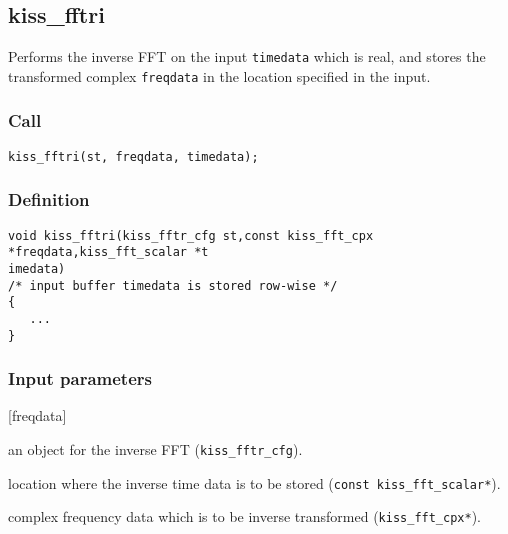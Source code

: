 \subsection{{kiss\_fftri}}
Performs the inverse FFT on the input \texttt{timedata} which is real, and stores the transformed complex \texttt{freqdata} in the location specified in the input.

\subsubsection*{Call}
\begin{verbatim}kiss_fftri(st, freqdata, timedata);\end{verbatim}

\subsubsection*{Definition}
\begin{verbatim}
void kiss_fftri(kiss_fftr_cfg st,const kiss_fft_cpx *freqdata,kiss_fft_scalar *t
imedata)
/* input buffer timedata is stored row-wise */
{
   ...
}
\end{verbatim}

\subsubsection*{Input parameters}
\begin{desclist}{\tt}{\quad}[freqdata]
   \setlength\itemsep{0pt}
   \item[st]       an object for the inverse FFT (\texttt{kiss\_fftr\_cfg}).  
   \item[timedata] location where the inverse time data is to be stored (\texttt{const kiss\_fft\_scalar*}).  
   \item[freqdata] complex frequency data which is to be inverse transformed (\texttt{kiss\_fft\_cpx*}).
\end{desclist}

